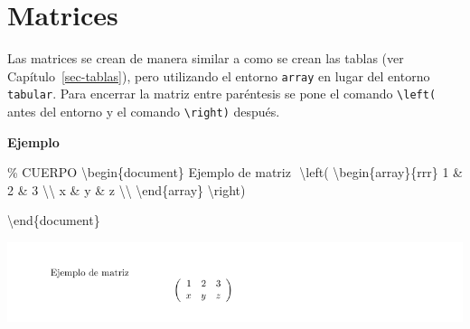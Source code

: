\documentclass[
  letterpaper,
  DIV=11,
  numbers=noendperiod]{scrreport}
\newenvironment{Shaded}{\begin{snugshade}}{\end{snugshade}}
\newcommand{\CommentTok}[1]{\textcolor[rgb]{0.37,0.37,0.37}{#1}}
\newcommand{\ExtensionTok}[1]{\textcolor[rgb]{0.00,0.23,0.31}{#1}}
\newcommand{\KeywordTok}[1]{\textcolor[rgb]{0.00,0.23,0.31}{#1}}
\newcommand{\NormalTok}[1]{\textcolor[rgb]{0.00,0.23,0.31}{#1}}
\newcommand{\SpecialCharTok}[1]{\textcolor[rgb]{0.37,0.37,0.37}{#1}}
\newcommand{\SpecialStringTok}[1]{\textcolor[rgb]{0.13,0.47,0.30}{#1}}
\begin{document}
\hypertarget{matrices}{%
\section{Matrices}\label{matrices}}

Las matrices se crean de manera similar a como se crean las tablas (ver
Capítulo~\ref{sec-tablas}), pero utilizando el entorno \texttt{array} en
lugar del entorno \texttt{tabular}. Para encerrar la matriz entre
paréntesis se pone el comando \texttt{\textbackslash{}left(} antes del
entorno y el comando \texttt{\textbackslash{}right)} después.

\textbf{Ejemplo}

\begin{Shaded}
\begin{Highlighting}[]
\CommentTok{\% CUERPO}
\KeywordTok{\textbackslash{}begin}\NormalTok{\{}\ExtensionTok{document}\NormalTok{\}}
\NormalTok{Ejemplo de matriz}
\SpecialStringTok{$$}
\SpecialCharTok{\textbackslash{}left}\SpecialStringTok{(}
\KeywordTok{\textbackslash{}begin}\NormalTok{\{}\ExtensionTok{array}\NormalTok{\}}\SpecialStringTok{\{rrr\}}
\SpecialStringTok{1 \& 2 \& 3 }\SpecialCharTok{\textbackslash{}\textbackslash{}}
\SpecialStringTok{x \& y \& z }\SpecialCharTok{\textbackslash{}\textbackslash{}}
\KeywordTok{\textbackslash{}end}\NormalTok{\{}\ExtensionTok{array}\NormalTok{\}}
\SpecialCharTok{\textbackslash{}right}\SpecialStringTok{)}
\SpecialStringTok{$$}



\KeywordTok{\textbackslash{}end}\NormalTok{\{}\ExtensionTok{document}\NormalTok{\}}
\end{Highlighting}
\end{Shaded}

\begin{tcolorbox}[enhanced jigsaw, opacitybacktitle=0.6, coltitle=black, colbacktitle=quarto-callout-note-color!10!white, title={Salida}, colback=white, toprule=.15mm, breakable, opacityback=0, left=2mm, rightrule=.15mm, toptitle=1mm, colframe=quarto-callout-note-color-frame, bottomtitle=1mm, titlerule=0mm, arc=.35mm, bottomrule=.15mm, leftrule=.75mm]
\includegraphics{./img/formulas/matriz.png}
\end{tcolorbox}
\end{document}
